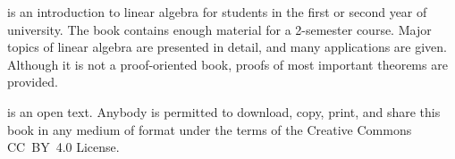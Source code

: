 
\textit{\bookfulltitle} is an introduction to linear algebra for
students in the first or second year of university. The book contains
enough material for a 2-semester course. Major topics of linear
algebra are presented in detail, and many applications are
given. Although it is not a proof-oriented book, proofs of most
important theorems are provided.

\textit{\bookfulltitle} is an open text. Anybody is permitted to
download, copy, print, and share this book in any medium of format
under the terms of the Creative Commons CC~BY~4.0 License.
